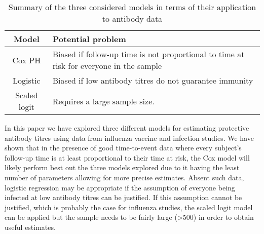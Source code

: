 \begin{table}[htp]
\centering
\caption{Summary of the three considered models in terms of their application to antibody data}
\begin{tabular}{cp{25em}}
\toprule
Model & Potential problem \\
\midrule
Cox PH & Biased if follow-up time is not proportional to time at risk for everyone in the sample \\
Logistic & Biased if low antibody titres do not guarantee immunity \\
Scaled logit & Requires a large sample size. \\
\bottomrule
\end{tabular}
\end{table}

In this paper we have explored three different models for estimating protective antibody titres using data from influenza vaccine and infection studies.  We have shown that in the presence of good time-to-event data where every subject's follow-up time is at least proportional to their time at risk, the Cox model will likely perform best out the three models explored due to it having the least number of parameters allowing for more precise estimates. Absent such data, logistic regression may be appropriate if the assumption of everyone being infected at low antibody titres can be justified. If this assumption cannot be justified, which is probably the case for influenza studies, the scaled logit model can be applied but the sample needs to be fairly large (>500) in order to obtain useful estimates.
